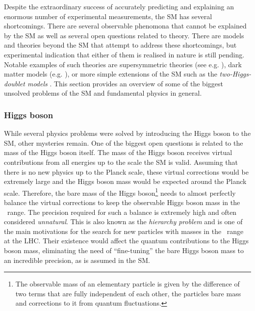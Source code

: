 Despite the extraordinary success of accurately predicting and explaining an enormous number of experimental measurements, the SM has several shortcomings.
There are several observable phenomona that cannot be explained by the SM as well as several open questions related to theory. 
There are models and theories beyond the SM that attempt to address these shortcomings, but experimental indication that either of them is realised in nature is still pending.
Notable examples of such theories are supersymmetric theories (see e.g. ), dark matter models (e.g. ), or more simple extensions of the SM such as the \emph{two-Higgs-doublet models} \cite{Branco_2012}.
This section provides an overview of some of the biggest unsolved problems of the SM and fundamental physics in general.




\subsubsection{Higgs boson}
While several physics problems were solved by introducing the Higgs boson to the SM, other mysteries remain. 
One of the biggest open questions is related to the mass of the Higgs boson itself. 
The mass of the Higgs boson receives virtual contributions from all energies up to the scale the SM is valid. 
Assuming that there is no new physics up to the Planck scale, these virtual corrections would be extremely large and the Higgs boson mass would be expected around the Planck scale. 
Therefore, the bare mass of the Higgs boson\footnote{The observable mass of an elementary particle is given by the difference of two terms that are fully independent of each other, the particles bare mass and corrections to it from quantum fluctuations.}
needs to almost perfectly balance the virtual corrections to keep the observable Higgs boson mass in the \GeV\ range. The precision required for such a balance is extremely high and often considered \emph{unnatural}.
This is also known as the \emph{hierarchy problem} and is one of the main motivations for the search for new particles with masses in the \TeV\ range at the LHC. 
Their existence would affect the quantum contributions to the Higgs boson mass, eliminating the need of ``fine-tuning'' the bare Higgs boson mass to an incredible precision, as is assumed in the SM. 

